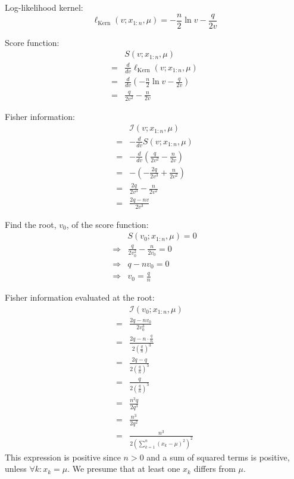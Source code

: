 \documentclass{article}
\begin{document}
\begin{ssolution}
Log-likelihood kernel:
\[\ell_{\text{Kern}}(v;x_{1:n},\mu) = -\frac{n}{2}\ln v - \frac{q}{2v}\]

Score function:
\begin{align*}
	& S(v;x_{1:n},\mu) \\
	=& \frac{d}{dv}\ell_{\text{Kern}}(v;x_{1:n},\mu) \\
	=& \frac{d}{dv}\left(-\frac{n}{2}\ln v - \frac{q}{2v}\right) \\
	=& \frac{q}{2v^2} - \frac{n}{2v}
\end{align*}

Fisher information:
\begin{align*}
	& \mathcal{I}(v;x_{1:n},\mu) \\
	=& -\frac{d}{dv}S(v;x_{1:n},\mu) \\
	=& -\frac{d}{dv}\left(\frac{q}{2v^2} - \frac{n}{2v}\right) \\
	=& -\left(-\frac{2q}{2v^3} + \frac{n}{2v^2}\right) \\
	=& \frac{2q}{2v^3} - \frac{n}{2v^2} \\
	=& \frac{2q-nv}{2v^3}
\end{align*}

Find the root, \(v_0\), of the score function:
\begin{align*}
	& S(v_0;x_{1:n},\mu) = 0 \\
	\Rightarrow& \frac{q}{2v_0^2} - \frac{n}{2v_0} = 0 \\
	\Rightarrow& q - nv_0 = 0 \\
	\Rightarrow& v_0 = \frac{q}{n}
\end{align*}

Fisher information evaluated at the root:
\begin{align*}
	& \mathcal{I}(v_0;x_{1:n},\mu) \\
	=& \frac{2q-nv_0}{2v_0^3} \\
	=& \frac{2q-n\cdot \frac{q}{n}}{2(\frac{q}{n})^3} \\
	=& \frac{2q-q}{2(\frac{q}{n})^3} \\
	=& \frac{q}{2(\frac{q}{n})^3} \\
	=& \frac{n^3q}{2q^3} \\
	=& \frac{n^3}{2q^2} \\
	=& \frac{n^3}{2\left(\sum_{k=1}^n (x_k-\mu)^2\right)^2}
\end{align*}
This expression is positive since \(n>0\) and a sum of squared terms is positive,
unless \(\forall k: x_k = \mu\).
We presume that at least one \(x_k\) differs from \(\mu\).


\end{ssolution}
\end{document}
